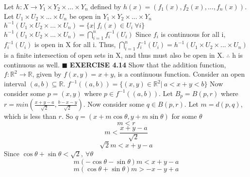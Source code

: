 \documentclass[12pt]{article}
\begin{document}
  \newline
  Let \(h: X \rightarrow Y_1 \times Y_2 \times ... \times Y_n\) defined by \(h(x) = (f_1(x),f_2(x),...,f_n(x))\).
  \newline \newline
  Let \(U_1 \times U_2 \times ... \times U_n\) be open in \(Y_1 \times Y_2 \times ... \times Y_n\)
  \newline
  \(h^{-1}(U_1 \times U_2 \times ... \times U_n) = \{x|\ f_i(x) \in U_i\ \forall i\}\)
  \newline
  \(h^{-1}(U_1 \times U_2 \times ... \times U_n) = \bigcap_{i=1}^nf_i^{-1}(U_i)\)
  \newline \newline
  Since \(f_i\) is continuous for all i, \(f_i^{-1}(U_i)\) is open in X for all i.
  \newline
  Thus, \(\bigcap_{i=1}^nf_i^{-1}(U_i) = h^{-1}(U_1 \times U_2 \times ... \times U_n)\) is a finite intersection of open sets in X, and thus must also be open in X.
  \newline
  \(\therefore\) h is continuous as well.
  \newline \(\blacksquare\)
  \newpage
  \noindent
  \textbf{EXERCISE 4.14}
  \newline
  Show that the addition function, \(f: \mathbb{R}^2 \rightarrow \mathbb{R}\), given by \(f(x,y) = x+y\), is a continuous function.
  \newline \newline
  Consider an open interval \((a,b) \subseteq \mathbb{R}\).
  \newline
  \(f^{-1}((a,b)) = \{(x,y) \in \mathbb{R}^2|\ a < x+y < b\}\)
  \newline
  Now consider some \(p = (x,y)\) where \(p \in f^{-1}((a,b))\).
  \newline \newline
  Let \(B_p = B(p, r)\) where \(r = min\left(\frac{x+y-a}{\sqrt{2}},\frac{b-x-y}{\sqrt{2}}\right)\).
  \newline
  Now consider some \(q \in B(p, r)\).
  \newline
  Let \(m = d(p,q)\), which is less than \(r\).
  \newline
  So \(q = (x+m\cos\theta, y + m\sin\theta)\) for some \(\theta\)
  \newline
  \[m < r\]
  \[m < \frac{x+y-a}{\sqrt{2}}\]
  \[\sqrt{2}m < x+y-a\]
  Since \(\cos \theta + \sin \theta < \sqrt{2},\ \forall \theta\)
  \[m(-\cos \theta - \sin \theta)m < x + y - a\]
  \[m(\cos \theta + \sin \theta)m > - x - y + a\]
\end{document}
